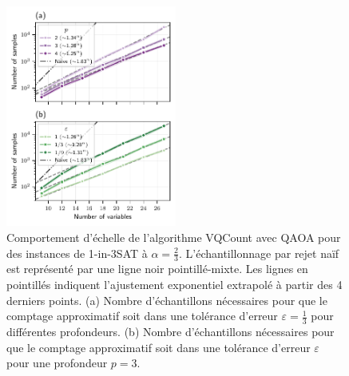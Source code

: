 \begin{figure}[H]
    \centering
    \includegraphics[width=0.5\textwidth]{figures/1in3sat-number-of-samples.pdf}
    \caption[Comportement d'échelle du nombre d'échantillons pour \#1-in-3SAT]{Comportement d'échelle de l'algorithme VQCount avec QAOA pour des instances de 1-in-3SAT à $\alpha=\frac{2}{3}$. L'échantillonnage par rejet naïf est représenté par une ligne noir pointillé-mixte. Les lignes en pointillés indiquent l'ajustement exponentiel extrapolé à partir des 4 derniers points. (a) Nombre d'échantillons nécessaires pour que le comptage approximatif soit dans une tolérance d'erreur $\varepsilon = \frac{1}{3}$ pour différentes profondeurs. (b) Nombre d'échantillons nécessaires pour que le comptage approximatif soit dans une tolérance d'erreur $\varepsilon$ pour une profondeur $p=3$.}
    \label{fig:1in3sat-number-of-samples}
\end{figure}


